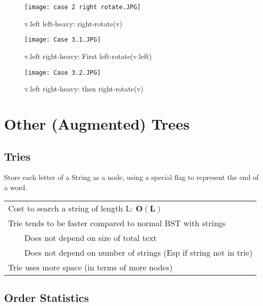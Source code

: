 \documentclass{article}
\newcommand{\tabitem}{~~\llap{\textbullet}~~}
\begin{document}
    \begin{figure}[htbp]
        \begin{center}
        \texttt{[image: case 2 right rotate.JPG]}
        \caption{v.left left-heavy: right-rotate(v)}
        \label{rightrot2}
        \end{center}
    \end{figure}

    \begin{figure}[htbp]
        \begin{center}
        \texttt{[image: Case 3.1.JPG]}
        \caption{v.left right-heavy: First left-rotate(v.left)}
        \label{case31}
        \end{center}
    \end{figure}

    \begin{figure}[htbp]
        \begin{center}
        \texttt{[image: Case 3.2.JPG]}
        \caption{v.left right-heavy: then right-rotate(v)}
        \label{case32}
        \end{center}
    \end{figure}


    \pagebreak

    \section{Other (Augmented) Trees}
    \subsection{Tries}
    Store each letter of a String as a node, using a special flag to represent the end of a word.

    \begin{tabular}{l}
        Cost to search a string of length L: $\bm{O(L)}$\\
        Trie tends to be faster compared to normal BST with strings\\
        \tabitem Does not depend on size of total text\\
        \tabitem Does not depend on number of strings (Esp if string not in trie)\\
        Trie uses more space (in terms of more nodes)
    \end{tabular}
    
    \subsection{Order Statistics}
\end{document}
